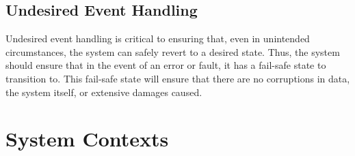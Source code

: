 \documentclass[12pt, titlepage]{article}
\begin{document}
\subsection{Undesired Event Handling}
Undesired event handling is critical to ensuring that, even in unintended circumstances, the system can safely revert to a desired state. Thus, the system should ensure that in the event of an error or fault, it has a fail-safe state to transition to. This fail-safe state will ensure that there are no corruptions in data, the system itself, or extensive damages caused.



\section{System Contexts}
\end{document}
